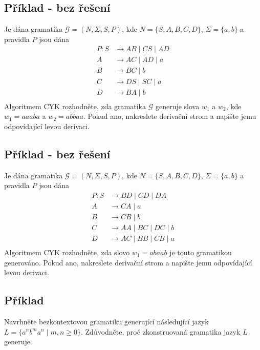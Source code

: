 \subsection{Příklad - bez řešení} %
Je dána gramatika $\mathcal{G} = (N, \Sigma, S, P)$, kde $N = \{S,A,B,C,D\}$, $\Sigma = \{a,b\}$ a pravidla $P$ 
jsou dána
\begin{align*}
  P:  S & \rightarrow AB \mid CS \mid AD \\
    A & \rightarrow AC \mid AD \mid a \\
    B & \rightarrow BC \mid b \\ 
    C & \rightarrow DS \mid SC \mid a \\
    D & \rightarrow BA \mid b \\
\end{align*}
Algoritmem CYK rozhodněte, zda gramatika $\mathcal{G}$ generuje slova $w_1$ a $w_2$, kde $w_1 = aaaba$ a 
$w_2 = abbaa$. Pokud ano, nakreslete derivační strom a napište jemu odpovídající levou derivaci.




\subsection{Příklad - bez řešení}
Je dána gramatika $\mathcal{G} = (N, \Sigma, S, P)$, kde $N = \{S,A,B,C,D\}$, $\Sigma = \{a,b\}$ a pravidla $P$ 
jsou dána
\begin{align*}
  P:  S & \rightarrow BD \mid CD \mid DA \\
    A & \rightarrow CA \mid a \\
    B & \rightarrow CB \mid b \\ 
    C & \rightarrow AA \mid BC \mid DC \mid b \\
    D & \rightarrow AC \mid BB \mid CB \mid a \\
\end{align*}
Algoritmem CYK rozhodněte, zda slovo $w_1 = abaab$ je touto gramatikou generováno. Pokud ano, nakreslete derivační 
strom a napište jemu odpovídající levou derivaci.

\subsection{Příklad}  %

Navrhněte bezkontextovou gramatiku generující následující jazyk $L = \{a^nb^ma^n \mid m, n \geq 0\}$. Zdůvodněte, 
proč zkonstruovaná gramatika jazyk $L$ generuje.


